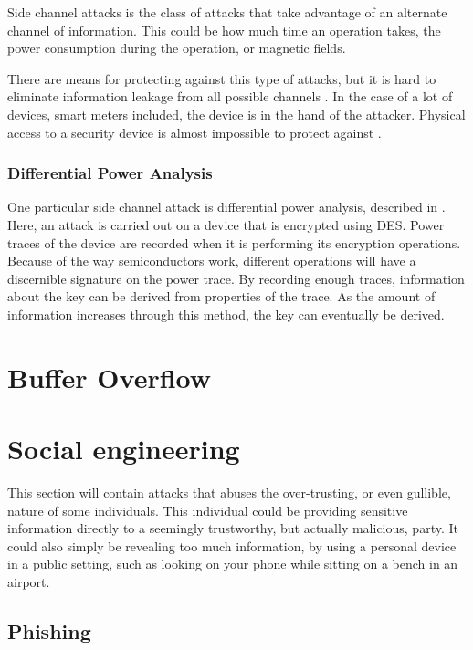 Side channel attacks is the class of attacks that take advantage of an alternate channel of information.
This could be how much time an operation takes, the power consumption during the operation, or magnetic fields.

There are means for protecting against this type of attacks, but it is hard to eliminate information leakage from all possible channels \citep[p.~132]{cryptoenginering}.
In the case of a lot of devices, smart meters included, the device is in the hand of the attacker.
Physical access to a security device is almost impossible to protect against \citep[p.~132]{cryptoenginering}.

\subsubsection{Differential Power Analysis}\label{attack:dpa}
One particular side channel attack is differential power analysis, described in \citet{DPA}.
Here, an attack is carried out on a device that is encrypted using DES.
Power traces of the device are recorded when it is performing its encryption operations.
Because of the way semiconductors work, different operations will have a discernible signature on the power trace.
By recording enough traces, information about the key can be derived from properties of the trace.
As the amount of information increases through this method, the key can eventually be derived.



\section{Buffer Overflow}\label{attack:bufferoverflow}


\section{Social engineering}
This section will contain attacks that abuses the over-trusting, or even gullible, nature of some individuals.
This individual could be providing sensitive information directly to a seemingly trustworthy, but actually malicious, party.
It could also simply be revealing too much information, by using a personal device in a public setting, such as looking on your phone while sitting on a bench in an airport.

\subsection{Phishing}\label{attack:phishing}

